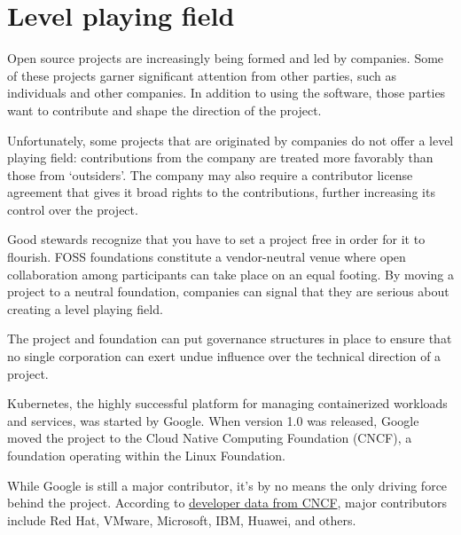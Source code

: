 


\chapter{Level playing field}

Open source projects are increasingly being formed and led by companies.  Some of these projects garner significant attention from other parties, such as individuals and other companies.  In addition to using the software, those parties want to contribute and shape the direction of the project.

Unfortunately, some projects that are originated by companies do not offer a level playing field: contributions from the company are treated more favorably than those from `outsiders'.  The company may also require a contributor license agreement that gives it broad rights to the contributions, further increasing its control over the project.

Good stewards recognize that you have to set a project free in order for it to flourish.  FOSS foundations constitute a vendor-neutral venue where open collaboration among participants can take place on an equal footing.  By moving a project to a neutral foundation, companies can signal that they are serious about creating a level playing field.

The project and foundation can put governance structures in place to ensure that no single corporation can exert undue influence over the technical direction of a project.

\begin{kaobox}[frametitle=Kubernetes and the Cloud Native Computing Foundation]

Kubernetes, the highly successful platform for managing containerized workloads and services, was started by Google.  When version 1.0 was released, Google moved the project to the Cloud Native Computing Foundation (CNCF), a foundation operating within the Linux Foundation.

While Google is still a major contributor, it's by no means the only driving force behind the project.  According to \href{https://k8s.devstats.cncf.io/d/9/companies-table}{developer data from CNCF}, major contributors include Red Hat, VMware, Microsoft, IBM, Huawei, and others.

\end{kaobox}

